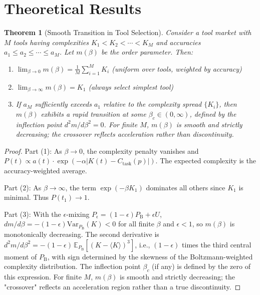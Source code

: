 \documentclass[12pt]{article}
\newtheorem{theorem}{Theorem}[section]
\theoremstyle{definition}
\begin{document}
\section{Theoretical Results}

\begin{theorem}[Smooth Transition in Tool Selection]\label{thm:crossover}
Consider a tool market with $M$ tools having complexities $K_1 < K_2 < \cdots < K_M$ and accuracies $a_1 \leq a_2 \leq \cdots \leq a_M$. Let $m(\beta)$ be the order parameter. Then:
\begin{enumerate}
  \item $\lim_{\beta \to 0} m(\beta) = \frac{1}{M}\sum_{i=1}^M K_i$ (uniform over tools, weighted by accuracy)
  \item $\lim_{\beta \to \infty} m(\beta) = K_1$ (always select simplest tool)
  \item If $a_M$ sufficiently exceeds $a_1$ relative to the complexity spread $\{K_i\}$, then $m(\beta)$ exhibits a rapid transition at some $\beta_c \in (0, \infty)$, defined by the inflection point $d^2m/d\beta^2 = 0$. For finite $M$, $m(\beta)$ is smooth and strictly decreasing; the crossover reflects acceleration rather than discontinuity.
\end{enumerate}
\end{theorem}

\begin{proof}
Part (1): As $\beta \to 0$, the complexity penalty vanishes and $P(t) \propto a(t) \cdot \exp(-\alpha |K(t) - C_{\mathrm{task}}(p)|)$. The expected complexity is the accuracy-weighted average.

Part (2): As $\beta \to \infty$, the term $\exp(-\beta K_1)$ dominates all others since $K_1$ is minimal. Thus $P(t_1) \to 1$.

Part (3): With the $\epsilon$-mixing $P_\epsilon = (1-\epsilon)P_{\mathrm{B}} + \epsilon U$, $dm/d\beta = -(1-\epsilon)\mathrm{Var}_{P_{\mathrm{B}}}(K) < 0$ for all finite $\beta$ and $\epsilon < 1$, so $m(\beta)$ is monotonically decreasing. The second derivative is $d^2m/d\beta^2 = -(1-\epsilon)\,\mathbb{E}_{P_{\mathrm{B}}}[(K-\langle K \rangle)^3]$, i.e., $(1-\epsilon)$ times the third central moment of $P_{\mathrm{B}}$, with sign determined by the skewness of the Boltzmann-weighted complexity distribution. The inflection point $\beta_c$ (if any) is defined by the zero of this expression. For finite $M$, $m(\beta)$ is smooth and strictly decreasing; the "crossover" reflects an acceleration region rather than a true discontinuity.
\end{proof}
\end{document}
